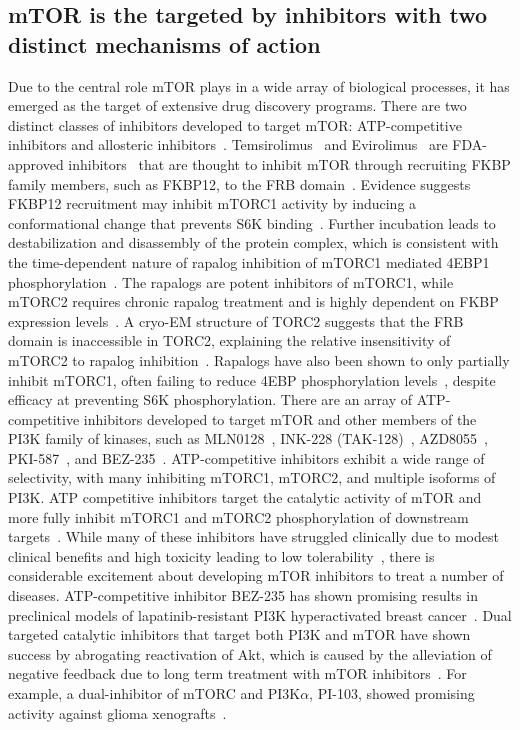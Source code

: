 \documentclass[phd,tocprelim]{cornell}
\begin{document}
\subsection{mTOR is the targeted by inhibitors with two distinct mechanisms of action}
Due to the central role mTOR plays in a wide array of biological processes, it has emerged as the target of extensive drug discovery programs. There are two distinct classes of inhibitors developed to target mTOR: ATP-competitive inhibitors and allosteric inhibitors~\citep{Ballou:2008ec,Lamming:2013kg}. Temsirolimus~\citep{Hudes:2007kp} and Evirolimus~\citep{Motzer:2008cn} are FDA-approved inhibitors~\citep{fda-approved-kinase-inhibitors} that are thought to inhibit mTOR through recruiting FKBP family members, such as FKBP12, to the FRB domain~\citep{Hausch:2013iu}. Evidence suggests FKBP12 recruitment may inhibit mTORC1 activity by inducing a conformational change that prevents S6K binding~\citep{Yip:2010bm}. Further incubation leads to destabilization and disassembly of the protein complex, which is consistent with the time-dependent nature of rapalog inhibition of mTORC1 mediated 4EBP1 phosphorylation~\citep{Yip:2010bm}. The rapalogs are potent inhibitors of mTORC1, while mTORC2 requires chronic rapalog treatment and is highly dependent on FKBP expression levels~\citep{Schreiber:2015fi}. A cryo-EM structure of TORC2 suggests that the FRB domain is inaccessible in TORC2, explaining the relative insensitivity of mTORC2 to rapalog inhibition~\citep{Gaubitz:2015gr}. Rapalogs have also been shown to only partially inhibit mTORC1, often failing to reduce 4EBP phosphorylation levels~\citep{Saxton:2017cv}, despite efficacy at preventing S6K phosphorylation. 
There are an array of ATP-competitive inhibitors developed to target mTOR and other members of the PI3K family of kinases, such as MLN0128~\citep{Slotkin:2015je,Hassan:2014kl}, INK-228 (TAK-128)~\citep{GarciaGarcia:2012jc}, AZD8055~\citep{Chresta:2010ir}, PKI-587~\citep{Mallon:2011gn}, and BEZ-235~\citep{Mukherjee:2012ki}. ATP-competitive inhibitors exhibit a wide range of selectivity, with many inhibiting mTORC1, mTORC2, and multiple isoforms of PI3K. ATP competitive inhibitors target the catalytic activity of mTOR and more fully inhibit mTORC1 and mTORC2 phosphorylation of downstream targets~\citep{Saxton:2017cv}. While many of these inhibitors have struggled clinically due to modest clinical benefits and high toxicity leading to low tolerability~\citep{Pongas:2016jm}, there is considerable excitement about developing mTOR inhibitors to treat a number of diseases. ATP-competitive inhibitor BEZ-235 has shown promising results in preclinical models of lapatinib-resistant PI3K hyperactivated breast cancer~\citep{Eichhorn:2008ff}.  Dual targeted catalytic inhibitors that target both PI3K and mTOR have shown success by abrogating reactivation of Akt, which is caused by the alleviation of negative feedback due to long term treatment with mTOR inhibitors~\citep{RodrikOutmezguine:2011fb}. For example, a dual-inhibitor of mTORC and PI3K$\alpha$, PI-103, showed promising activity against glioma xenografts~\citep{Fan:2006kw}. 
\end{document}
